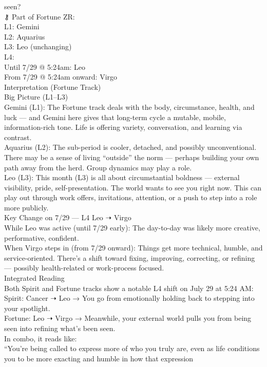 \documentclass{article}
\begin{document}
seen?\\
⚷ Part of Fortune ZR:\\
L1: Gemini\\
L2: Aquarius\\
L3: Leo (unchanging)\\
L4:\\
Until 7/29 @ 5:24am: Leo\\
From 7/29 @ 5:24am onward: Virgo\\
 Interpretation (Fortune Track)\\
Big Picture (L1--L3)\\
Gemini (L1): The Fortune track deals with the body, circumstance,
health, and luck --- and Gemini here gives that long-term cycle a
mutable, mobile, information-rich tone. Life is offering variety,
conversation, and learning via contrast.\\
Aquarius (L2): The sub-period is cooler, detached, and possibly
unconventional. There may be a sense of living ``outside'' the norm ---
perhaps building your own path away from the herd. Group dynamics may
play a role.\\
Leo (L3): This month (L3) is all about circumstantial boldness ---
external visibility, pride, self-presentation. The world wants to see
you right now. This can play out through work offers, invitations,
attention, or a push to step into a role more publicly.\\
Key Change on 7/29 --- L4 Leo ➝ Virgo\\
While Leo was active (until 7/29 early): The day-to-day was likely more
creative, performative, confident.\\
When Virgo steps in (from 7/29 onward): Things get more technical,
humble, and service-oriented. There's a shift toward fixing, improving,
correcting, or refining --- possibly health-related or work-process
focused.\\
 Integrated Reading\\
Both Spirit and Fortune tracks show a notable L4 shift on July 29 at
5:24 AM:\\
Spirit: Cancer ➝ Leo → You go from emotionally holding back to stepping
into your spotlight.\\
Fortune: Leo ➝ Virgo → Meanwhile, your external world pulls you from
being seen into refining what's been seen.\\
 In combo, it reads like:\\
``You're being called to express more of who you truly are, even as life
conditions you to be more exacting and humble in how that expression
\end{document}
